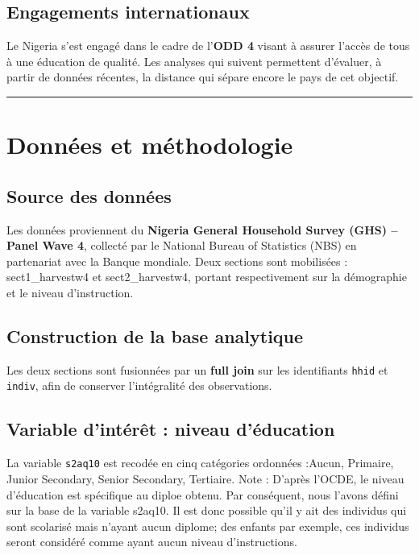 \documentclass[
]{article}
\begin{document}
\subsection{Engagements
internationaux}\label{engagements-internationaux}

Le Nigeria s'est engagé dans le cadre de l'\textbf{ODD 4} visant à
assurer l'accès de tous à une éducation de qualité. Les analyses qui
suivent permettent d'évaluer, à partir de données récentes, la distance
qui sépare encore le pays de cet objectif.

\begin{center}\rule{0.5\linewidth}{0.5pt}\end{center}

\section{Données et méthodologie}\label{donnuxe9es-et-muxe9thodologie}

\subsection{Source des données}\label{source-des-donnuxe9es}

Les données proviennent du \textbf{Nigeria General Household Survey
(GHS) -- Panel Wave 4}, collecté par le National Bureau of Statistics
(NBS) en partenariat avec la Banque mondiale. Deux sections sont
mobilisées : sect1\_harvestw4 et sect2\_harvestw4, portant
respectivement sur la démographie et le niveau d'instruction.

\subsection{Construction de la base
analytique}\label{construction-de-la-base-analytique}

Les deux sections sont fusionnées par un \textbf{full join} sur les
identifiants \texttt{hhid} et \texttt{indiv}, afin de conserver
l'intégralité des observations.

\subsection{Variable d'intérêt : niveau
d'éducation}\label{variable-dintuxe9ruxeat-niveau-duxe9ducation}

La variable \texttt{s2aq10} est recodée en cinq catégories ordonnées
:Aucun, Primaire, Junior Secondary, Senior Secondary, Tertiaire. Note :
D'après l'OCDE, le niveau d'éducation est spécifique au diploe obtenu.
Par conséquent, nous l'avons défini sur la base de la variable s2aq10.
Il est donc possible qu'il y ait des individus qui sont scolarisé mais
n'ayant aucun diplome; des enfants par exemple, ces individus seront
considéré comme ayant aucun niveau d'instructions.
\end{document}
